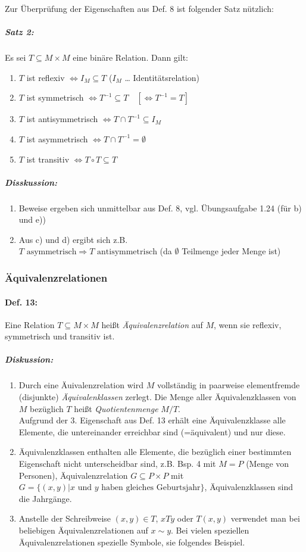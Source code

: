 Zur Überprüfung der Eigenschaften aus Def. 8 ist folgender Satz nützlich:
\subparagraph{Satz 2:} \parskp
Es sei $T \subseteq M \times M$ eine binäre Relation. Dann gilt:
\begin{enumerate} [label=\alph*)]
\item $T$ ist reflexiv $\Leftrightarrow I_M \subseteq T$  ($I_M$ … Identitätsrelation)
\item $T$ ist symmetrisch $\Leftrightarrow T^{-1}\subseteq T \quad [\Leftrightarrow T^{-1} = T] $
\item $T$ ist antisymmetrisch $\Leftrightarrow T \cap T^{-1} \subseteq I_M$
\item $T$ ist asymmetrisch $\Leftrightarrow T \cap T^{-1} = \emptyset$
\item $T$ ist transitiv $\Leftrightarrow T \circ T \subseteq T$
\end{enumerate}

\subparagraph{Disskussion:}
\begin{enumerate}
\item Beweise ergeben sich unmittelbar aus Def. 8, vgl. Übungsaufgabe 1.24 (für b) und e))
\item Aus c) und d) ergibt sich z.B.\\
$\boxed{T \text{ asymmetrisch}}\Rightarrow \boxed{T \text{ antisymmetrisch}}$ (da $\emptyset$ Teilmenge jeder Menge ist)
\end{enumerate}

\subsubsection{Äquivalenzrelationen} \label{subsec:Äquivalenzrelationen}
\paragraph{Def. 13:} \parskp
Eine Relation $T \subseteq M \times M$ heißt \emph{Äquivalenzrelation} auf $M$, wenn sie reflexiv, symmetrisch und transitiv ist.
\subparagraph{Diskussion:}
\begin{enumerate}
\item Durch eine Äuivalenzrelation wird $M$ vollständig in paarweise elementfremde (disjunkte) \emph{Äquivalenklassen} zerlegt. Die Menge aller Äquivalenzklassen von $M$ bezüglich $T$ heißt \emph{Quotientenmenge} $M/T$.\\
Aufgrund der 3. Eigenschaft aus Def. 13 erhält eine Äquivalenzklasse alle Elemente, die untereinander erreichbar sind (=äquivalent) und nur diese.
\item Äquivalenzklassen enthalten alle Elemente, die bezüglich einer bestimmten Eigenschaft nicht unterscheidbar sind, z.B. Bsp. 4 mit $M=P$ (Menge von Personen), Äquivalenzrelation $G\subseteq P \times P$ mit $G=\{ (x,y) | x \text{ und } y \text{ haben gleiches Geburtsjahr}\}$, Äquivalenzklassen sind die Jahrgänge.
\item Anstelle der Schreibweise $(x,y) \in T$, $xTy$ oder $T(x,y)$ verwendet man bei beliebigen Äquivalenzrelationen auf $x\sim y$. Bei vielen speziellen Äquivalenzrelationen spezielle Symbole, sie folgendes Beispiel.
\end{enumerate}

